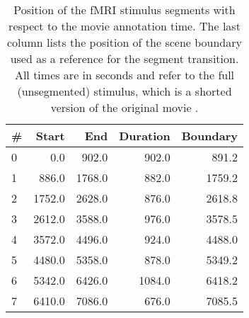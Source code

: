 \begin{table}
  \centering
  \begin{tabular}{lrrrr}
  \#  & Start  & End    & Duration& Boundary \\
  \hline
   0  & 0.0    & 902.0  & 902.0  & 891.2    \\
   1  & 886.0  & 1768.0 & 882.0  & 1759.2   \\
   2  & 1752.0 & 2628.0 & 876.0  & 2618.8   \\
   3  & 2612.0 & 3588.0 & 976.0  & 3578.5   \\
   4  & 3572.0 & 4496.0 & 924.0  & 4488.0   \\
   5  & 4480.0 & 5358.0 & 878.0  & 5349.2   \\
   6  & 5342.0 & 6426.0 & 1084.0 & 6418.2   \\
   7  & 6410.0 & 7086.0 & 676.0  & 7085.5   \\
  \end{tabular}

  \caption{Position of the fMRI stimulus segments with respect to the movie
    annotation time. The last column lists the position of the scene boundary
    used as a reference for the segment transition. All times are in seconds
    and refer to the full (unsegmented) stimulus, which is a shorted version of
    the original movie \cite{HBI+14}.}

  \label{tab:timing}
\end{table}




